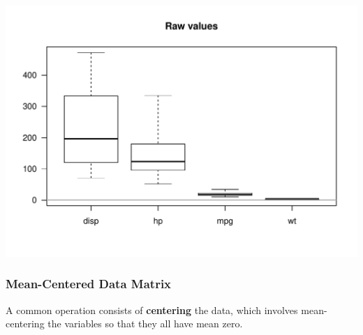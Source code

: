 \documentclass[12pt]{beamer}\usepackage[]{graphicx}\usepackage[]{color}
\makeatletter
\def\maxwidth{ %
  \ifdim\Gin@nat@width>\linewidth
    \linewidth
  \else
    \Gin@nat@width
  \fi
}
\newenvironment{knitrout}{}{} %
\makeatother
\begin{document}

\begin{frame}[fragile]

\begin{knitrout}\footnotesize
{}\color{fgcolor}

{\centering \includegraphics[width=\maxwidth]{figure/unnamed-chunk-3-1} 

}



\end{knitrout}

\end{frame}


\begin{frame}
\begin{center}
\Huge{}
\end{center}
\end{frame}


\begin{frame}
\frametitle{Mean-Centered Data Matrix}

A common operation consists of {\hilit \textbf{centering}} the data, which involves
mean-centering the variables so that they all have mean zero.

\end{frame}

\end{document}
